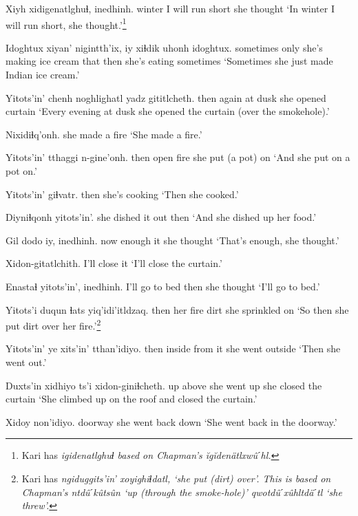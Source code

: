 \documentclass[12pt]{article}
\begin{document}
\gll Xiyh xidigenatlghuɬ, inedhinh.
winter {I will run short} {she thought}
\glt `In winter I will run short, she thought.'\footnote{Kari has \em igidenatlghuɬ \em based on Chapman's \em \u{i}g\u{i}den\"atlxw\^uˊhl.}
\glend

\gll Idoghtux xiyan' nigintth'ix, iy xiɬdik uhonh idoghtux.
sometimes only {she's making ice cream} that then {she's eating} sometimes
\glt `Sometimes she just made Indian ice cream.'
\glend

\gll Yitots'in' chenh noghlighatl {yadz gititlcheth.}
then again {at dusk} {she opened curtain}
\glt `Every evening at dusk she opened the curtain (over the smokehole).'
\glend

\gll Nixidiɬq'onh.
{{she made a fire}}
\glt `She made a fire.'
\glend

\gll Yitots'in' tthaggi n-gine'onh.
then {open fire} {she put (a pot) on} 
\glt `And she put on a pot on.'
\glend

\gll Yitots'in' giɬvatr.
then {she's cooking}
\glt `Then she cooked.'
\glend

\gll Diyniɬqonh yitots'in'.
{she dished it out} then
\glt `And she dished up her food.'
\glend

\gll Gil dodo iy, inedhinh.
now enough it {she thought}
\glt `That's enough, she thought.'
\glend

\gll Xidon-gitatlchith.
{{I'll close it}}
\glt `I'll close the curtain.'
\glend

\gll Enastaɬ yitots'in', inedhinh.
{I'll go to bed} then {she thought}
\glt `I'll go to bed.'
\glend

\gll Yitots'i duqun ɬats yiq'idi'itldzaq.
then {her fire} dirt {she sprinkled on}
\glt `So then she put dirt over her fire.'\footnote{Kari has \em ngiduggits'in' xoyighiɬdatl, \em `she put (dirt) over'. This is based on Chapman's \em ntd\^uˊk\^uts\^un \em `up (through the smoke-hole)' \em qwotd\^uˊx\^uhltd\"aˊtl \em `she threw'.}
\glend

\gll Yitots'in' ye xits'in' tthan'idiyo.
then inside {from it} {she went outside}
\glt `Then she went out.'
\glend

\gll Duxts'in xidhiyo ts'i xidon-giniɬcheth.
{up above} {she went up} {} {she closed the curtain}
\glt `She climbed up on the roof and closed the curtain.'
\glend

\gll Xidoy non'idiyo.
doorway {she went back down}
\glt `She went back in the doorway.'
\glend
\end{document}
